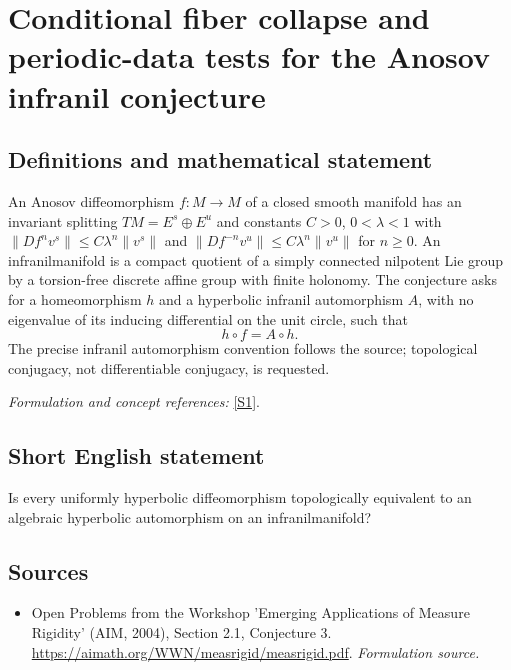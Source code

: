 \documentclass[11pt]{article}
\begin{document}
\section*{\texorpdfstring{Conditional fiber collapse and periodic-data tests for the Anosov infranil conjecture}{Conditional fiber collapse and periodic-data tests for the Anosov infranil conjecture}}\label{20003265}
\subsection{Definitions and mathematical statement}
An Anosov diffeomorphism $f:M\to M$ of a closed smooth manifold has an invariant splitting $TM=E^s\oplus E^u$ and constants $C>0$, $0<\lambda<1$ with
$\|Df^nv^s\|\le C\lambda^n\|v^s\|$ and
$\|Df^{-n}v^u\|\le C\lambda^n\|v^u\|$ for $n\ge0$.
An infranilmanifold is a compact quotient of a simply connected nilpotent Lie group by a torsion-free discrete affine group with finite holonomy. The conjecture asks for a homeomorphism $h$ and a hyperbolic infranil automorphism $A$, with no eigenvalue of its inducing differential on the unit circle, such that
\[
 h\circ f=A\circ h.
\]
The precise infranil automorphism convention follows the source; topological conjugacy, not differentiable conjugacy, is requested.
\par\smallskip\textit{Formulation and concept references:} \href{https://aimath.org/WWN/measrigid/measrigid.pdf}{[S1]}.

\subsection{Short English statement}
Is every uniformly hyperbolic diffeomorphism topologically equivalent to an algebraic hyperbolic automorphism on an infranilmanifold?
\subsection{Sources}
\begin{itemize}
\item[S1]Open Problems from the Workshop 'Emerging Applications of Measure Rigidity' (AIM, 2004), Section 2.1, Conjecture 3.
\url{https://aimath.org/WWN/measrigid/measrigid.pdf}.
\textit{Formulation source.}
\end{itemize}
\end{document}
